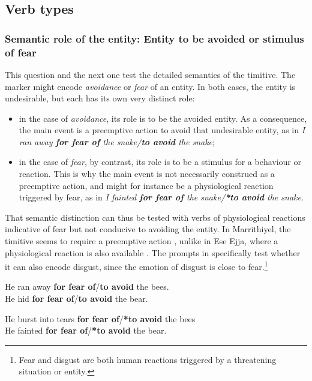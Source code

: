 \documentclass[output=paper,colorlinks,citecolor=brown]{langscibook}
\begin{document}
\subsection{Verb types}
\label{subsec:timverbtypes}

\subsubsection{Semantic role of the entity: Entity to be avoided or stimulus of fear}
\label{3.2.1}

This question and the next one test the detailed semantics of the timitive. The marker might encode \textit{avoidance} or \textit{fear} of an entity. In both cases, the entity is undesirable, but each has its own very distinct role:

\begin{itemize}
    \item in the case of \textit{avoidance}, its role is to be the avoided entity. As a consequence, the main event is a preemptive action to avoid that undesirable entity, as in \textit{I ran away \textbf{for fear of} the snake/\textbf{to avoid} the snake};
    \item in the case of \textit{fear}, by contrast, its role is to be a stimulus for a behaviour or reaction. This is why the main event is not necessarily construed as a preemptive action, and might for instance be a physiological reaction triggered by fear, as in \textit{I fainted \textbf{for fear of} the snake/\textbf{*to avoid} the snake}.
\end{itemize}


That semantic distinction can thus be tested with verbs of physiological reactions indicative of fear but not conducive to avoiding the entity. In Marrithiyel, the timitive seems to require a preemptive action \citep[58]{green1989}, unlike in Ese Ejja, where a physiological reaction is also available \citep[284]{vuillermet2018a}. The prompts in  specifically test whether it can also encode disgust, since the emotion of disgust is close to fear.\footnote{Fear and disgust are both human reactions triggered by a threatening situation or entity.}

\ea \label{p64}
\ea \label{p64a} He ran away \textbf{for fear of}/\textbf{to avoid} the bees. \\
\ex \label{p64b} He hid \textbf{for fear of}/\textbf{to avoid} the bear.
\z
\z

\ea \label{p65}
\ea \label{p65a} He burst into tears \textbf{for fear of}/\textbf{*to avoid} the bees \\
\ex \label{p65b} He fainted \textbf{for fear of}/\textbf{*to avoid} the bear.
\z
\z
\end{document}
